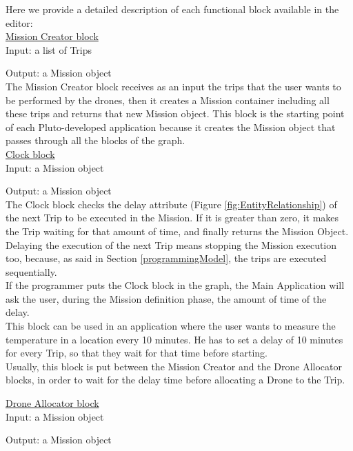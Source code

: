 Here we provide a detailed description of each functional block available in the editor:
\\

\underline{Mission Creator block}
\\

Input: a list of Trips

Output: a Mission object
\\

The Mission Creator block receives as an input the trips that the user wants to be performed by the drones, then it creates a Mission container including all these trips and returns that new Mission object.
This block is the starting point of each Pluto-developed application because it creates the Mission object that passes through all the blocks of the graph.
\\

\underline{Clock block}
\\

Input: a Mission object

Output: a Mission object
\\

The Clock block checks the delay attribute (Figure \ref{fig:EntityRelationship}) of the next Trip to be executed in the Mission. If it is greater than zero, it makes the Trip waiting for that amount of time, and finally returns the Mission Object.
Delaying the execution of the next Trip means stopping the Mission execution too, because, as said in Section \ref{programmingModel}, the trips are executed sequentially.
\\
If the programmer puts the Clock block in the graph, the Main Application will ask the user, during the Mission definition phase, the amount of time of the delay.
\\
This block can be used in an application where the user wants to measure the temperature in a location every 10 minutes.
He has to set a delay of 10 minutes for every Trip, so that they wait for that time before starting.
\\
Usually, this block is put between the Mission Creator and the Drone Allocator blocks, in order to wait for the delay time before allocating a Drone to the Trip.

\newpage

\underline{Drone Allocator block}
\\

Input: a Mission object

Output: a Mission object
\\

